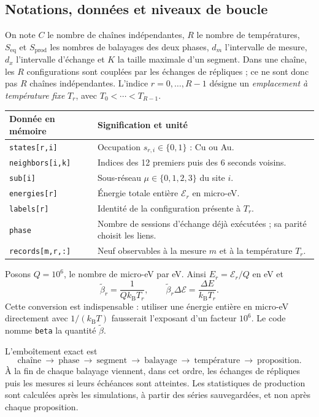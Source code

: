 \documentclass[10pt,a4paper]{article}
\newcommand{\kb}{k_{\mathrm B}}
\begin{document}
\subsection{Notations, données et niveaux de boucle}
On note $C$ le nombre de chaînes indépendantes, $R$ le nombre de températures,
$S_{\mathrm{eq}}$ et $S_{\mathrm{prod}}$ les nombres de balayages des deux
phases, $d_m$ l'intervalle de mesure, $d_x$ l'intervalle d'échange et $K$ la
taille maximale d'un segment. Dans une chaîne, les $R$ configurations sont
couplées par les échanges de répliques ; ce ne sont donc pas $R$ chaînes
indépendantes. L'indice $r=0,\ldots,R-1$ désigne un \emph{emplacement à
température fixe} $T_r$, avec $T_0<\cdots<T_{R-1}$.

\begin{center}\small
\begin{tabular}{p{.27\linewidth}p{.64\linewidth}}
\toprule
Donnée en mémoire & Signification et unité\\
\midrule
\texttt{states[r,i]} & Occupation $s_{r,i}\in\{0,1\}$ : Cu ou Au.\\
\texttt{neighbors[i,k]} & Indices des 12 premiers puis des 6 seconds voisins.\\
\texttt{sub[i]} & Sous-réseau $\mu\in\{0,1,2,3\}$ du site $i$.\\
\texttt{energies[r]} & Énergie totale entière $\mathcal E_r$ en micro-eV.\\
\texttt{labels[r]} & Identité de la configuration présente à $T_r$.\\
\texttt{phase} & Nombre de sessions d'échange déjà exécutées ; sa parité choisit les liens.\\
\texttt{records[m,r,:]} & Neuf observables à la mesure $m$ et à la température $T_r$.\\
\bottomrule
\end{tabular}
\end{center}

Posons $Q=10^6$, le nombre de micro-eV par eV. Ainsi
$E_r=\mathcal E_r/Q$ en eV et
\[
 \widetilde\beta_r=\frac{1}{Q\kb T_r},\qquad
 \widetilde\beta_r\Delta\mathcal E=\frac{\Delta E}{\kb T_r}.
\]
Cette conversion est indispensable : utiliser une énergie entière en
micro-eV directement avec $1/(\kb T)$ fausserait l'exposant d'un facteur $10^6$.
Le code nomme \texttt{beta} la quantité $\widetilde\beta$.

L'emboîtement exact est
\[
\boxed{\text{chaîne}\ \to\ \text{phase}\ \to\ \text{segment}\ \to\
\text{balayage}\ \to\ \text{température}\ \to\ \text{proposition}.}
\]
À la fin de chaque balayage viennent, dans cet ordre, les échanges de
répliques puis les mesures si leurs échéances sont atteintes. Les statistiques
de production sont calculées après les simulations, à partir des séries
sauvegardées, et non après chaque proposition.
\end{document}
